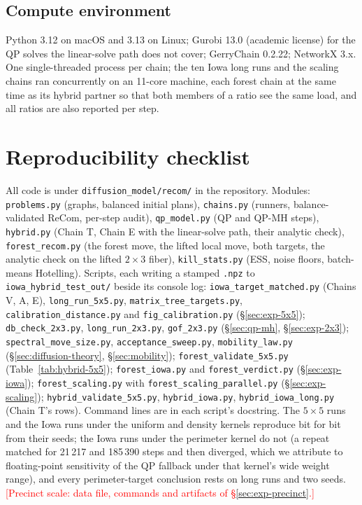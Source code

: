 \documentclass[11pt]{article}
\newcommand{\todo}[1]{\textcolor{red}{[#1]}}
\begin{document}
\subsection{Compute environment}\label{app:compute}

Python 3.12 on macOS and 3.13 on Linux; Gurobi 13.0 (academic license)
for the QP solves the linear-solve path does not cover; GerryChain
0.2.22; NetworkX 3.x. One single-threaded process per chain; the ten
Iowa long runs and the scaling chains ran concurrently on an 11-core
machine, each forest chain at the same time as its hybrid partner so
that both members of a ratio see the same load, and all ratios are
also reported per step.

\section{Reproducibility checklist}\label{app:reproducibility}

\begingroup
\raggedright\sloppy
All code is under \texttt{diffusion\_model/recom/} in the repository.
Modules: \texttt{problems.py} (graphs, balanced initial plans),
\texttt{chains.py} (runners, balance-validated ReCom, per-step audit),
\texttt{qp\_model.py} (QP and QP-MH steps), \texttt{hybrid.py} (Chain T,
Chain E with the linear-solve path, their analytic check),
\texttt{forest\_recom.py} (the forest move, the lifted local move, both
targets, the analytic check on the lifted $2 \times 3$ fiber),
\texttt{kill\_stats.py} (ESS, noise floors, batch-means Hotelling).
Scripts, each writing a stamped \texttt{.npz} to
\texttt{iowa\_hybrid\_test\_out/} beside its console log:
\texttt{iowa\_target\_matched.py} (Chains V, A, E),
\texttt{long\_run\_5x5.py}, \texttt{matrix\_tree\_targets.py},
\texttt{calibration\_distance.py} and \texttt{fig\_calibration.py}
(\S\ref{sec:exp-5x5}); \texttt{db\_check\_2x3.py}, \texttt{long\_run\_2x3.py},
\texttt{gof\_2x3.py} (\S\ref{sec:qp-mh}, \S\ref{sec:exp-2x3});
\texttt{spectral\_move\_size.py}, \texttt{acceptance\_sweep.py},
\texttt{mobility\_law.py} (\S\ref{sec:diffusion-theory},
\S\ref{sec:mobility}); \texttt{forest\_validate\_5x5.py}
(Table~\ref{tab:hybrid-5x5}); \texttt{forest\_iowa.py} and
\texttt{forest\_verdict.py} (\S\ref{sec:exp-iowa});
\texttt{forest\_scaling.py} with \texttt{forest\_scaling\_parallel.py}
(\S\ref{sec:exp-scaling}); \texttt{hybrid\_validate\_5x5.py},
\texttt{hybrid\_iowa.py}, \texttt{hybrid\_iowa\_long.py} (Chain T's
rows). Command lines are in each script's docstring. The $5 \times 5$
runs and the Iowa runs under the uniform and density kernels reproduce
bit for bit from their seeds; the Iowa runs under the perimeter kernel
do not (a repeat matched for 21\,217 and 185\,390 steps and then
diverged, which we attribute to floating-point sensitivity of the QP
fallback under that kernel's wide weight range), and every
perimeter-target conclusion rests on long runs and two seeds.
\todo{Precinct scale: data file, commands and artifacts of
\S\ref{sec:exp-precinct}.}
\par
\endgroup

{\small

}
\end{document}
